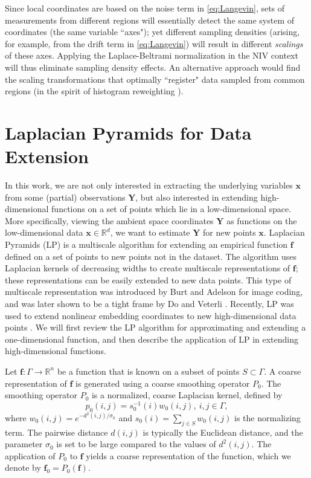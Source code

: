 Since local coordinates are based on the noise term in \eqref{eq:Langevin}, sets of measurements from different regions
will essentially detect the same system of coordinates (the same variable ``axes");
yet different sampling densities (arising, for example,
from the drift term in \eqref{eq:Langevin}) will result in different {\em scalings} of these axes.
%
Applying the Laplace-Beltrami normalization in the NIV context will thus eliminate sampling density effects.
%
An alternative approach would find the scaling transformations that optimally ``register"
data sampled from common regions (in the spirit of histogram reweighting \cite{ferrenberg1988new}).

\section{Laplacian Pyramids for Data Extension} \label{sec:LapPyr}

In this work, we are not only interested in extracting the underlying variables $\mathbf{x}$ from some (partial) observations $\mathbf{Y}$,
but also interested in extending high-dimensional functions on a set of points which lie in a low-dimensional space.
%
More specifically, viewing the ambient space coordinates $\mathbf{Y}$ as functions on the low-dimensional data $\mathbf{x} \in \mathbb{R}^d$,
we want to estimate $\mathbf{Y}$ for new points $\mathbf{x}$.
%
Laplacian Pyramids (LP) is a multiscale algorithm for extending an empirical function $\mathbf{f}$ defined on a set of points
to new points not in the dataset.
%
The algorithm uses Laplacian kernels of decreasing widths to create multiscale representations of $\mathbf{f}$;
these representations can be easily extended to new data points.
%
This type of multiscale representation was introduced by Burt and Adelson \cite{burt1983laplacian} for image coding,
and was later shown to be a tight frame by Do and Veterli \cite{do2003framing}.
%
Recently, LP was used to extend nonlinear embedding coordinates to new high-dimensional data points \cite{rabin2012heterogeneous}.
%
We will first review the LP algorithm for approximating and extending a one-dimensional function,
and then describe the application of LP in extending high-dimensional functions.

Let $\mathbf{f}: \Gamma \rightarrow \mathbb{R}^n$ be a function that is known on a subset of points $S \subset \Gamma$.
%
A coarse representation of $\mathbf{f}$ is generated using a coarse smoothing operator $P_0$.
%
The smoothing operator $P_0$ is a normalized, coarse Laplacian kernel, defined by
\begin{equation}
p_0(i, j)= s_0^{-1}(i)w_0(i, j),\: i, j \in \Gamma,
\end{equation}
where $w_0(i, j)=e^{-d^2(i, j) / \sigma_0}$ and $s_0(i)=\sum_{j \in S}w_0(i, j)$ is the normalizing term.
%
The pairwise distance $d(i, j)$ is typically the Euclidean distance, and the parameter $\sigma_0$ is set to be large compared to the values of $d^2(i, j)$.
%
The application of $P_0$ to $\mathbf{f}$ yields a coarse representation of the function, which we denote by $\mathbf{f}_0=P_0(\mathbf{f})$.

